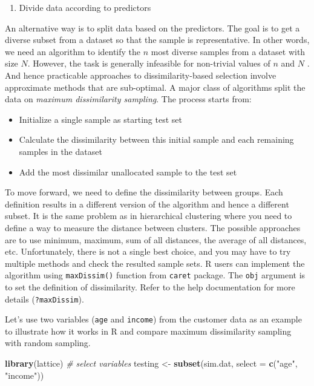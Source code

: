 \documentclass[12pt,]{krantz}
\newenvironment{Shaded}{\begin{snugshade}}{\end{snugshade}}
\newcommand{\KeywordTok}[1]{\textcolor[rgb]{0.13,0.29,0.53}{\textbf{{#1}}}}
\newcommand{\DataTypeTok}[1]{\textcolor[rgb]{0.13,0.29,0.53}{{#1}}}
\newcommand{\StringTok}[1]{\textcolor[rgb]{0.31,0.60,0.02}{{#1}}}
\newcommand{\CommentTok}[1]{\textcolor[rgb]{0.56,0.35,0.01}{\textit{{#1}}}}
\newcommand{\NormalTok}[1]{{#1}}
\providecommand{\tightlist}{%
  \setlength{\itemsep}{0pt}\setlength{\parskip}{0pt}}
\theoremstyle{definition}
\theoremstyle{definition}
\theoremstyle{remark}
\begin{document}
\begin{enumerate}
\def\labelenumi{(\arabic{enumi})}
\setcounter{enumi}{1}
\tightlist
\item
  Divide data according to predictors
\end{enumerate}

An alternative way is to split data based on the predictors. The goal is
to get a diverse subset from a dataset so that the sample is
representative. In other words, we need an algorithm to identify the
\(n\) most diverse samples from a dataset with size \(N\). However, the
task is generally infeasible for non-trivial values of \(n\) and \(N\)
\citep{willett}. And hence practicable approaches to dissimilarity-based
selection involve approximate methods that are sub-optimal. A major
class of algorithms split the data on \emph{maximum dissimilarity
sampling}. The process starts from:

\begin{itemize}
\tightlist
\item
  Initialize a single sample as starting test set
\item
  Calculate the dissimilarity between this initial sample and each
  remaining samples in the dataset
\item
  Add the most dissimilar unallocated sample to the test set
\end{itemize}

To move forward, we need to define the dissimilarity between groups.
Each definition results in a different version of the algorithm and
hence a different subset. It is the same problem as in hierarchical
clustering where you need to define a way to measure the distance
between clusters. The possible approaches are to use minimum, maximum,
sum of all distances, the average of all distances, etc. Unfortunately,
there is not a single best choice, and you may have to try multiple
methods and check the resulted sample sets. R users can implement the
algorithm using \texttt{maxDissim()} function from \texttt{caret}
package. The \texttt{obj} argument is to set the definition of
dissimilarity. Refer to the help documentation for more details
(\texttt{?maxDissim}).

Let's use two variables (\texttt{age} and \texttt{income}) from the
customer data as an example to illustrate how it works in R and compare
maximum dissimilarity sampling with random sampling.

\begin{Shaded}
\begin{Highlighting}[]
\KeywordTok{library}\NormalTok{(lattice)}
\CommentTok{# select variables}
\NormalTok{testing <-}\StringTok{ }\KeywordTok{subset}\NormalTok{(sim.dat, }\DataTypeTok{select =} \KeywordTok{c}\NormalTok{(}\StringTok{"age"}\NormalTok{, }\StringTok{"income"}\NormalTok{))}
\end{Highlighting}
\end{Shaded}
\end{document}

